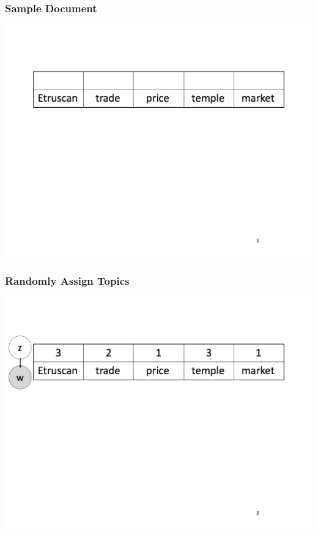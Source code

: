 \begin{frame}
  \frametitle{Sample Document}
    \includegraphics[width=\linewidth]{topic_models/mimno_001}
\end{frame}

\begin{frame}
  \frametitle{Randomly Assign Topics}
    \includegraphics[width=\linewidth]{topic_models/mimno_002}
\end{frame}

